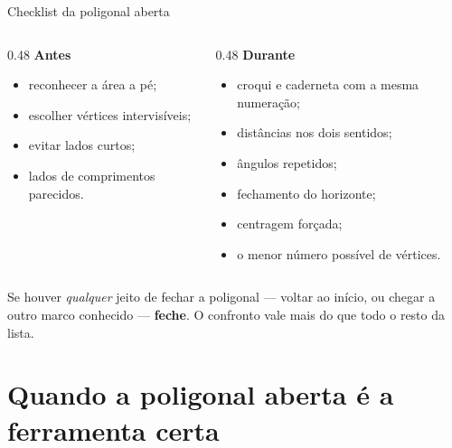 \documentclass[aspectratio=169,11pt]{beamer}
\newcommand{\bnum}[1]{\textbf{\textcolor{mTeal}{#1}}}
\begin{document}
\begin{frame}{Checklist da poligonal aberta}
  \begin{columns}[T]
    \begin{column}{0.48\textwidth}
      \textbf{Antes}
      \begin{itemize}
        \item reconhecer a área a pé;
        \item escolher vértices intervisíveis;
        \item evitar lados curtos;
        \item lados de comprimentos parecidos.
      \end{itemize}
    \end{column}
    \begin{column}{0.48\textwidth}
      \textbf{Durante}
      \begin{itemize}
        \item croqui e caderneta com a mesma numeração;
        \item distâncias nos dois sentidos;
        \item ângulos repetidos;
        \item fechamento do horizonte;
        \item centragem forçada;
        \item o menor número possível de vértices.
      \end{itemize}
    \end{column}
  \end{columns}
  \bigskip
  \centering
  \begin{cuidado}[title={E o principal}]
    Se houver \emph{qualquer} jeito de fechar a poligonal --- voltar ao início, ou chegar a
    outro marco conhecido --- \bnum{feche}. O confronto vale mais do que todo o resto da
    lista.
  \end{cuidado}
\end{frame}

\section{Quando a poligonal aberta é a ferramenta certa}
\end{document}
